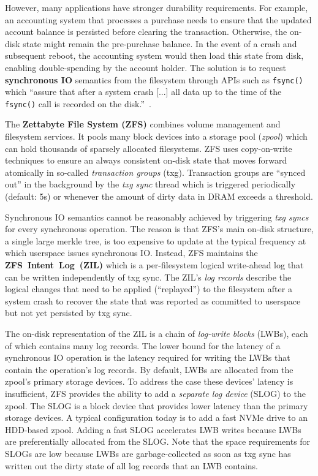 \documentclass[12pt,a4paper,twoside]{book}
\begin{document}
However, many applications have stronger durability requirements.
For example, an accounting system that processes a purchase needs to ensure that the updated account balance is persisted before clearing the transaction.
Otherwise, the on-disk state might remain the pre-purchase balance.
In the event of a crash and subsequent reboot, the accounting system would then load this state from disk, enabling double-spending by the account holder.
The solution is to request \textbf{synchronous IO} semantics from the filesystem through APIs such as \lstinline{fsync()} which ``assure that after a system crash [...] all data up to the time of the \lstinline{fsync()} call is recorded on the disk.''~\cite{OpenGroupFsync}.

The \textbf{Zettabyte File System (ZFS)} combines volume management and filesystem services.
It pools many block devices into a storage pool (\textit{zpool}) which can hold thousands of sparsely allocated filesystems.
ZFS uses copy-on-write techniques to ensure an always consistent on-disk state that moves forward atomically in so-called \textit{transaction groups} (txg).
Transaction groups are ``synced out'' in the background by the \textit{txg sync} thread which is triggered periodically (default: 5s) or whenever the amount of dirty data in DRAM exceeds a threshold.

Synchronous IO semantics cannot be reasonably achieved by triggering \textit{txg syncs} for every synchronous operation.
The reason is that ZFS's main on-disk structure, a single large merkle tree, is too expensive to update at the typical frequency at which userspace issues synchronous IO.
Instead, ZFS maintains the \mbox{\textbf{ZFS Intent Log (ZIL)}} which is a per-filesystem logical write-ahead log that can be written independently of txg sync.
The ZIL's \textit{log records} describe the logical changes that need to be applied (``replayed'') to the filesystem after a system crash to recover the state that was reported as committed to userspace but not yet persisted by txg sync.

The on-disk representation of the ZIL is a chain of \textit{log-write blocks} (LWBs), each of which contains many log records.
The lower bound for the latency of a synchronous IO operation is the latency required for writing the LWBs that contain the operation's log records.
By default, LWBs are allocated from the zpool's primary storage devices.
To address the case these devices' latency is insufficient, ZFS provides the ability to add a \textit{separate log device} (SLOG) to the zpool.
The SLOG is a block device that provides lower latency than the primary storage devices.
A typical configuration today is to add a fast NVMe drive to an HDD-based zpool.
Adding a fast SLOG accelerates LWB writes because LWBs are preferentially allocated from the SLOG.
Note that the space requirements for SLOGs are low because LWBs are garbage-collected as soon as txg sync has written out the dirty state of all log records that an LWB contains.
\end{document}
